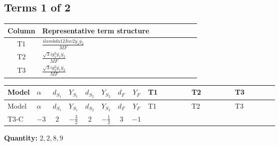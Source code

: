 \documentclass[8pt]{article}
\begin{document}
\begin{landscape}
\subsection*{Terms 1 of 2}
\begin{center}
\begin{tabular}{@{}c >{\raggedright\arraybackslash}p{0.82\linewidth}@{}}
\toprule
Column & Representative term structure \\
\midrule
T1 & \(\displaystyle \frac{i lambda12Inv2 \overline{y_{1}} \overline{y_{2}}}{MF}\) \\
\midrule
T2 & \(\displaystyle \frac{\sqrt{3} i g_{1}^{2} \overline{y_{1}} \overline{y_{2}}}{MF}\) \\
\midrule
T3 & \(\displaystyle \frac{\sqrt{3} i g_{2}^{2} \overline{y_{1}} \overline{y_{2}}}{MF}\) \\
\midrule
\bottomrule
\end{tabular}
\end{center}
\smallskip
\tiny
\begin{longtable}{@{}llcccccc >{\raggedright\arraybackslash}p{0.21\linewidth} >{\raggedright\arraybackslash}p{0.21\linewidth} >{\raggedright\arraybackslash}p{0.21\linewidth}@{}}
\toprule
Model & $\alpha$ & $d_{S_1}$ & $Y_{S_1}$ & $d_{S_2}$ & $Y_{S_2}$ & $d_F$ & $Y_F$ & T1 & T2 & T3 \\
\midrule
\endfirsthead
\toprule
Model & $\alpha$ & $d_{S_1}$ & $Y_{S_1}$ & $d_{S_2}$ & $Y_{S_2}$ & $d_F$ & $Y_F$ & T1 & T2 & T3 \\
\midrule
\endhead
T3-C & $-3$ & $2$ & $-\frac{3}{2}$ & $2$ & $-\frac{1}{2}$ & $3$ & $-1$ & \scriptsize\adjustbox{max width=\linewidth}{$\begin{gathered} \frac{i lambda12Inv2 \overline{y_{1}} \overline{y_{2}}}{3 MF}\end{gathered}$} & \scriptsize\adjustbox{max width=\linewidth}{$\begin{gathered} \frac{\sqrt{3} i g_{1}^{2} \overline{y_{1}} \overline{y_{2}}}{2 MF}\end{gathered}$} & \scriptsize\adjustbox{max width=\linewidth}{$\begin{gathered} \frac{\sqrt{3} i g_{2}^{2} \overline{y_{1}} \overline{y_{2}}}{4 MF}\end{gathered}$} \\
\midrule
\bottomrule
\end{longtable}
\clearpage
\noindent\textbf{Quantity: }$\mathrm{2,2,8,9}$\par\smallskip

\end{landscape}
\end{document}

